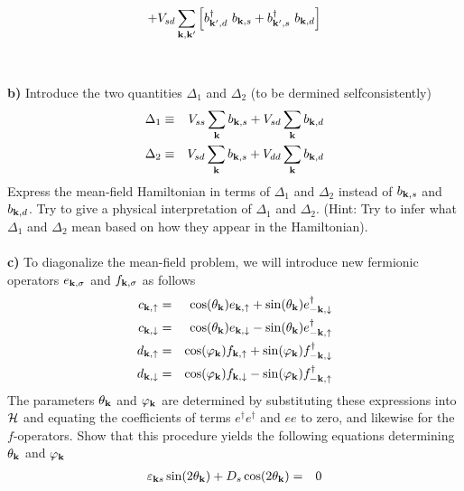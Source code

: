 \begin{problem}
\begin{eqnarray}
		+
		V_{sd}\sum_{{\bf k},{\bf k}^{\prime}}
		\left[ b^{\dagger}_{{\bf k}^{\prime},d}~b_{{\bf k},s} + b^{\dagger}_{{\bf k}^{\prime},s}~b_{{\bf k},d}  \right]  \nonumber
	\end{eqnarray}
	\ \\
	\ \\
	{\bf b)} Introduce the two quantities $\Delta_1$ and $\Delta_2$ (to be dermined selfconsistently)
	\begin{eqnarray}
		\Delta_1 & \equiv & V_{ss} \sum_{\bf k}b_{{\bf k},s} + V_{sd} \sum_{\bf k} b_{{\bf k},d} \nonumber \\
		\Delta_2 & \equiv & V_{sd} \sum_{\bf k}b_{{\bf k},s} + V_{dd} \sum_{\bf k} b_{{\bf k},d} \nonumber
	\end{eqnarray}
	Express the mean-field Hamiltonian in terms of $\Delta_1$ and $\Delta_2$ instead of $b_{{\bf k},s}$ and $b_{{\bf k},d}$. 
	Try to give  a physical interpretation of  $\Delta_1$ and $\Delta_2$. (Hint: Try to infer what $\Delta_1$ and $\Delta_2$ mean based on how they appear in the Hamiltonian). 
	\ \\
	\ \\
	{\bf c)} To diagonalize the mean-field problem, we will introduce new fermionic operators $e_{{\bf k},\sigma}$ and $f_{{\bf k},\sigma}$ as follows
	\begin{eqnarray}
		c_{{\bf k},\uparrow} & = & 
		\cos(\theta_{\bf k}) e_{{\bf k},\uparrow} +  \sin(\theta_{\bf k}) e^{\dagger}_{-{\bf k},\downarrow}  \nonumber \\
		c_{{\bf k},\downarrow} & = & 
		\cos(\theta_{\bf k}) e_{{\bf k},\downarrow} - \sin(\theta_{\bf k}) e^{\dagger}_{-{\bf k},\uparrow} \nonumber \\
		d_{{\bf k},\uparrow} & = & 
		\cos(\varphi_{\bf k}) f_{{\bf k},\uparrow} +  \sin(\varphi_{\bf k}) f^{\dagger}_{-{\bf k},\downarrow}  \nonumber \\
		d_{{\bf k},\downarrow} & = & 
		\cos(\varphi_{\bf k}) f_{{\bf k},\downarrow} - \sin(\varphi_{\bf k}) f^{\dagger}_{-{\bf k},\uparrow} \nonumber 
	\end{eqnarray}
	The parameters $\theta_{\bf k}$ and $\varphi_{\bf k}$ are determined by substituting these expressions into $\mathcal{H}$ and equating
	the coefficients of terms $e^{\dagger}e^{\dagger}  $ and $e e$ to zero, and likewise for the $f$-operators. Show that this procedure yields the following equations determining  $\theta_{\bf k}$ and $\varphi_{\bf k}$
	\begin{eqnarray}
		\varepsilon_{{\bf k} s}  \sin(2 \theta_{\bf k}) +  D_s \cos(2 \theta_{\bf k})  & = & 0 \nonumber \\

\end{eqnarray}
\end{problem}
